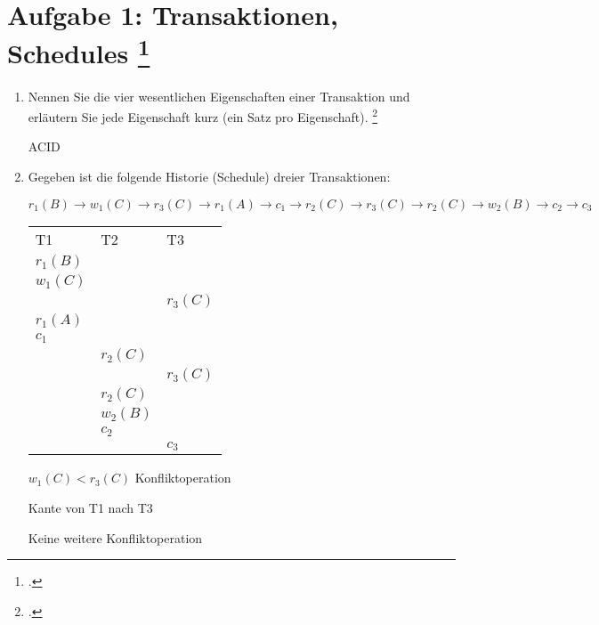 \documentclass{lehramt-informatik-aufgabe}
\begin{document}

\section{Aufgabe 1: Transaktionen, Schedules
\footcite{db:pu:5}}

\begin{enumerate}

\item Nennen Sie die vier wesentlichen Eigenschaften einer
Transaktion und erläutern Sie jede Eigenschaft kurz (ein Satz pro
Eigenschaft).
\footcite[Thema 1 Teilaufgabe 1 Aufgabe 5]{examen:46116:2016:03}

\begin{antwort}
ACID
\end{antwort}

\item Gegeben ist die folgende Historie (Schedule) dreier Transaktionen:

$
r_1 (B) \rightarrow
w_1 (C) \rightarrow
r_3 (C) \rightarrow
r_1 (A) \rightarrow
c_1 \rightarrow
r_2 (C) \rightarrow
r_3 (C) \rightarrow
r_2 (C) \rightarrow
w_2 (B) \rightarrow
c_2 \rightarrow
c_3
$

\begin{antwort}
\begin{tabular}{lll}
T1 & T2 & T3 \\
$r_1 (B)$ &           &           \\
$w_1 (C)$ &           &           \\
          &           & $r_3 (C)$ \\
$r_1 (A)$ &           &           \\
$c_1$     &           &           \\
          & $r_2 (C)$ &           \\
          &           & $r_3 (C)$ \\
          & $r_2 (C)$ &           \\
          & $w_2 (B)$ &           \\
          & $c_2$     &           \\
          &           & $c_3$     \\
\end{tabular}

$w_1 (C) < r_3 (C)$ Konfliktoperation

Kante von T1 nach T3

Keine weitere Konfliktoperation


\end{antwort}
\end{enumerate}
\end{document}
